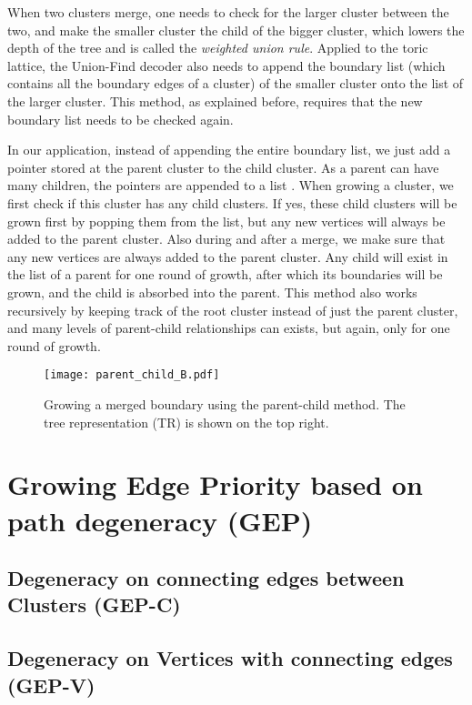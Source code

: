 When two clusters merge, one needs to check for the larger cluster between the two, and make the smaller cluster the child of the bigger cluster, which lowers the depth of the tree and is called the \emph{weighted union rule}. Applied to the toric lattice, the Union-Find decoder also needs to append the boundary list (which contains all the boundary edges of a cluster) of the smaller cluster onto the list of the larger cluster. This method, as explained before, requires that the new boundary list needs to be checked again.

In our application, instead of appending the entire boundary list, we just add a pointer stored at the parent cluster to the child cluster. As a parent can have many children, the pointers are appended to a list . When growing a cluster, we first check if this cluster has any child clusters. If yes, these child clusters will be grown first by popping them from the list, but any new vertices will always be added to the parent cluster. Also during and after a merge, we make sure that any new vertices are always added to the parent cluster. Any child will exist in the list of a parent for one round of growth, after which its boundaries will be grown, and the child is absorbed into the parent. This method also works recursively by keeping track of the root cluster instead of just the parent cluster, and many levels of parent-child relationships can exists, but again, only for one round of growth.

\begin{figure}
  \centering
  \texttt{[image: parent\_child\_B.pdf]}
  \caption{Growing a merged boundary using the parent-child method. The tree representation (TR) is shown on the top right. }\label{3.fig.parentchildB}
\end{figure}


\section{Growing Edge Priority based on path degeneracy (GEP)}

\subsection{Degeneracy on connecting edges between Clusters (GEP-C)}
\subsection{Degeneracy on Vertices with connecting edges (GEP-V)}

